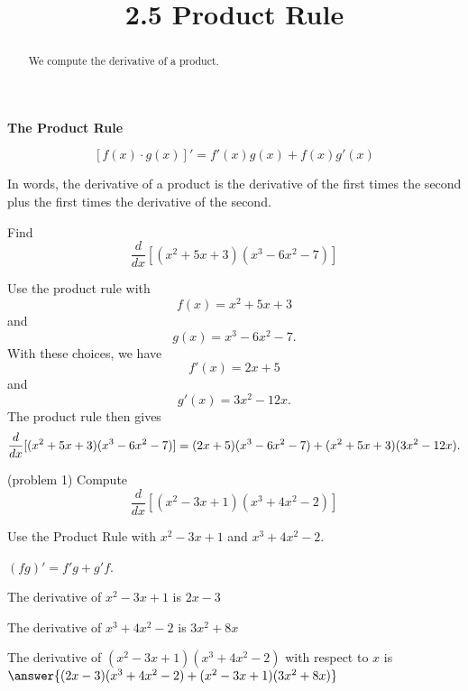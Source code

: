 \documentclass[handout]{ximera}
\title{2.5 Product Rule}
\begin{document}
\begin{abstract}
We compute the derivative of a product.
\end{abstract}

\maketitle


\begin{center}
\bf{The Product Rule}
\end{center}


\[[f(x) \cdot g(x)]' = f'(x)g(x) + f(x)g'(x)\]

In words, the derivative of a product is the derivative of the first times the second plus the first 
times the derivative of the second.\\

\begin{example}[example 1]
Find 
\[
\frac{d}{dx} [(x^2 + 5x+3)(x^3 - 6x^2 -7)]
\]

Use the product rule with 
\[
f(x) = x^2 + 5x+3
\]
and
\[
g(x) = x^3 -6x^2 -7.
\]
With these choices, we have
\[
f'(x) = 2x + 5
\]
and 
\[
g'(x) = 3x^2 - 12x.
\]
The product rule then gives
\[
\frac{d}{dx} [(x^2 + 5x+3)(x^3 - 6x^2 -7)]\\
=(2x+5)(x^3-6x^2 -7) + (x^2 + 5x+3)(3x^2 -12x).
\]
\end{example}


\begin{problem} (problem 1)
  Compute
  \[
  \frac{d}{dx}[(x^2 - 3x +1)(x^3 + 4x^2 -2)]
  \]
  
    \begin{hint}
      Use the Product Rule with $x^2 -3x+1$ and $x^3 +4x^2-2$.
    \end{hint}
    \begin{hint}
      $(fg)' = f'g+g'f$.
    \end{hint}
    \begin{hint}
      The derivative of $x^2 -3x+1$ is $2x-3$
    \end{hint}
    \begin{hint}
      The derivative of $x^3 + 4x^2 -2$ is $3x^2 +8x$
    \end{hint}
    
		The derivative of $(x^2 - 3x +1)(x^3 + 4x^2 -2)$ with respect to $x$ is
		 $\answer{(2x-3)(x^3+4x^2-2)+(x^2-3x+1)(3x^2+8x)}$
		
\end{problem}
\end{document}
